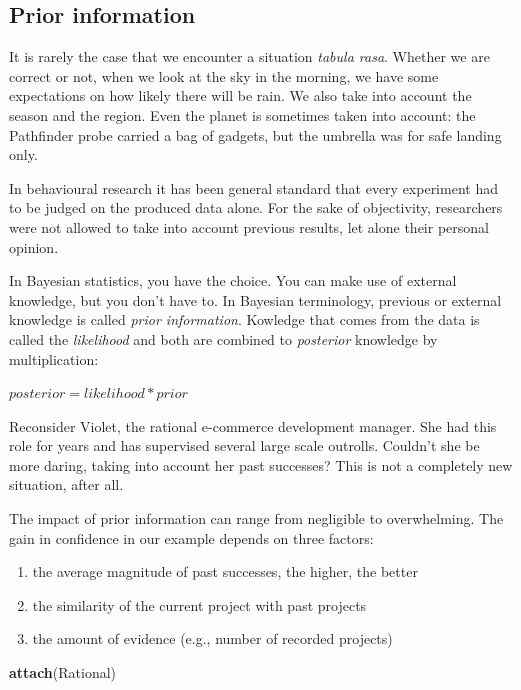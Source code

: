 \documentclass[]{svmono}
\newenvironment{Shaded}{\begin{snugshade}}{\end{snugshade}}
\newcommand{\KeywordTok}[1]{\textcolor[rgb]{0.13,0.29,0.53}{\textbf{#1}}}
\newcommand{\NormalTok}[1]{#1}
\providecommand{\tightlist}{%
  \setlength{\itemsep}{0pt}\setlength{\parskip}{0pt}}
\begin{document}
\subsection{Prior information}\label{prior-information}

It is rarely the case that we encounter a situation \emph{tabula rasa}.
Whether we are correct or not, when we look at the sky in the morning,
we have some expectations on how likely there will be rain. We also take
into account the season and the region. Even the planet is sometimes
taken into account: the Pathfinder probe carried a bag of gadgets, but
the umbrella was for safe landing only.

In behavioural research it has been general standard that every
experiment had to be judged on the produced data alone. For the sake of
objectivity, researchers were not allowed to take into account previous
results, let alone their personal opinion.

In Bayesian statistics, you have the choice. You can make use of
external knowledge, but you don't have to. In Bayesian terminology,
previous or external knowledge is called \emph{prior information}.
Kowledge that comes from the data is called the \emph{likelihood} and
both are combined to \emph{posterior} knowledge by multiplication:

\(posterior = likelihood * prior\)

Reconsider Violet, the rational e-commerce development manager. She had
this role for years and has supervised several large scale outrolls.
Couldn't she be more daring, taking into account her past successes?
This is not a completely new situation, after all.

The impact of prior information can range from negligible to
overwhelming. The gain in confidence in our example depends on three
factors:

\begin{enumerate}
\def\labelenumi{\arabic{enumi})}
\tightlist
\item
  the average magnitude of past successes, the higher, the better
\item
  the similarity of the current project with past projects
\item
  the amount of evidence (e.g., number of recorded projects)
\end{enumerate}

\begin{Shaded}
\begin{Highlighting}[]
\KeywordTok{attach}\NormalTok{(Rational)}
\end{Highlighting}
\end{Shaded}
\end{document}
